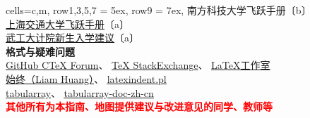 \begin{table}[H]
\begin{tblr}[
            tall,
            theme = {no-caption},
            note{1} = {符号含义：\newline〔a〕:已获编委（主编）授权；〔b〕：已询问，暂未答复；〔c〕：未能联系到作者。},
        ]{
            cells={c,m},
            row{1,3,5,7} = {5ex},
            row{9} = {7ex},
        }
{{{        南方科技大学飞跃手册}}〔b〕                                                               \\
        \uline{\href{https://github.com/SurviveSJTU/SJTU-Application}{%
        上海交通大学飞跃手册}}〔a〕                                                               \\
        \uline{\href{https://gitee.com/hanyaner/WITjsj}{%
        武工大计院新生入学建议}}〔a〕}                                                            \\
        {\large\textbf{格式与疑难问题}}                                                           \\
        {
        {\uline{\href{https://github.com/CTeX-org/forum/issues}{GitHub CTeX Forum}}、%
                \uline{\href{https://tex.stackexchange.com}{TeX StackExchange}}、%
        \uline{\href{https://www.latexstudio.net}{LaTeX工作室}}}                                  \\
        {\uline{\href{https://liam.page}{始终（Liam Huang）}}、%
        \uline{\href{https://ctan.org/pkg/latexindent}{latexindent.pl}}}                          \\
        {\uline{\href{https://github.com/lvjr/tabularray}{tabularray}}、%
        \uline{\href{https://gitee.com/nwafu_nan/tabularray-doc-zh-cn}{tabularray-doc-zh-cn}}}
        }                                                                                         \\
        {\large\textbf{\textcolor{red}{其他所有为本指南、地图提供建议与改进意见的同学、教师等}}}
    \end{tblr}


\end{table}
